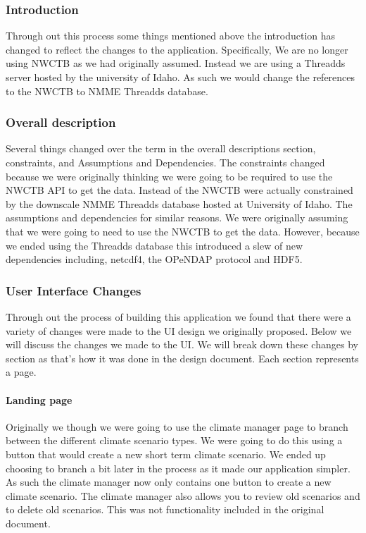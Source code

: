 \documentclass[onecolumn, draftclsnofoot,10pt, compsoc]{article}
\begin{document}
        \subsubsection{Introduction}
	    Through out this process some things mentioned above the introduction has changed to reflect the changes to the application. Specifically, We are no longer using NWCTB as we had originally assumed. Instead we are using a Threadds server hosted by the university of Idaho. As such we would change the references to the NWCTB to NMME Threadds database.\\ 
	    
	    \subsubsection{Overall description}
	    Several things changed over the term in the overall descriptions section, constraints, and Assumptions and Dependencies. The constraints changed because we were originally thinking we were going to be required to use the NWCTB API to get the data. Instead of the NWCTB were actually constrained by the downscale NMME Threadds database hosted at University of Idaho. The assumptions and dependencies for similar reasons. We were originally assuming that we were going to need to use the NWCTB to get the data. However, because we ended using the Threadds database this introduced a slew of new dependencies including, netcdf4, the OPeNDAP protocol and HDF5.\\
	    
	    \subsubsection{User Interface Changes}
	    Through out the process of building this application we found that there were a variety of changes were made to the UI design we originally proposed. Below we will discuss the changes we made to the UI. We will break down these changes by section as that's how it was done in the design document. Each section represents a page.\\
	    
	        \paragraph{Landing page}
	         Originally we though we were going to use the climate manager page to branch between the different climate scenario types. We were going to do this using a button that would create a new short term climate scenario. We ended up choosing to branch a bit later in the process as it made our application simpler. As such the climate manager now only contains one button to create a new climate scenario. The climate manager also allows you to review old scenarios and to delete old scenarios. This was not functionality included in the original document.\\
	    
\end{document}
